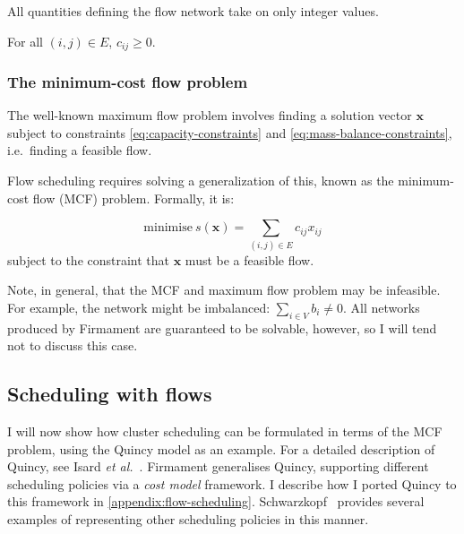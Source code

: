 \begin{assumption}[Integrality] \label{assumption:integrality}
All quantities defining the flow network take on only integer values.\\
\end{assumption}

\begin{assumption} \label{assumption:non-negative-arc-costs}
For all $(i,j) \in E$, $c_{ij} \geq 0$. \\
\end{assumption}

\subsubsection{The minimum-cost flow problem} \label{sec:prep-flow-mcf}

The well-known maximum flow problem involves finding a solution vector
$\mathbf{x}$ subject to constraints \cref{eq:capacity-constraints} and \cref{eq:mass-balance-constraints}, i.e.\ finding a feasible flow.

Flow scheduling requires solving a generalization of this, known as the minimum-cost flow (MCF) problem. Formally, it is:

\begin{equation} \label{eq:mcf-primal-problem}
\mbox{minimise}\ s(\mathbf{x})=\sum_{(i,j)\in E}c_{ij}x_{ij}
\end{equation}
subject to the constraint that $\mathbf{x}$ must be a feasible flow.

Note, in general, that the MCF and maximum flow problem may be infeasible. For example, the network might be imbalanced: $\sum_{i\in V}b_{i}\neq0$. All networks produced by Firmament are guaranteed to be solvable, however, so I will tend not to discuss this case\footnotemark.

\subsection{Scheduling with flows} \label{sec:prep-flow-scheduling}

I will now show how cluster scheduling can be formulated in terms of the MCF problem, using the Quincy model as an example. For a detailed description of Quincy, see Isard \textit{et al.}~\cite{Isard:2009}. Firmament generalises Quincy, supporting different scheduling policies via a \emph{cost model} framework. I describe how I ported Quincy to this framework in \cref{appendix:flow-scheduling}. Schwarzkopf~\cite[ch.~5]{Schwarzkopf:2015} provides several examples of representing other scheduling policies in this manner.

